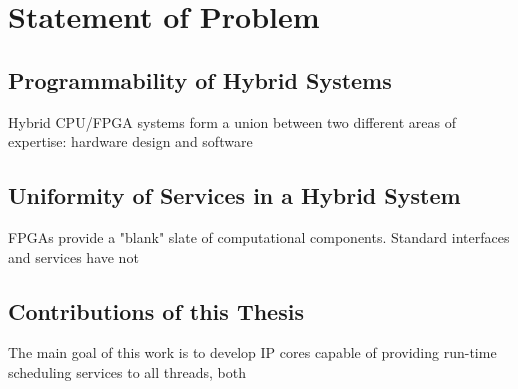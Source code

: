 \chapter{Statement of Problem}
\label{sec:problem}

\section{Programmability of Hybrid Systems} Hybrid CPU/FPGA systems form a
union between two different areas of expertise: hardware design and software

\section{Uniformity of Services in a Hybrid System} FPGAs provide a "blank"
slate of computational components.  Standard interfaces and services have not

\section{Contributions of this Thesis} The main goal of this work is to develop
IP cores capable of providing run-time scheduling services to all threads, both
